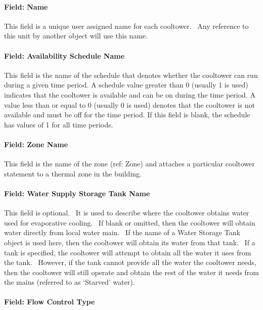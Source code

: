 \paragraph{Field: Name}\label{field-name-8-002}

This field is a unique user assigned name for each cooltower.~ Any reference to this unit by another object will use this name.

\paragraph{Field: Availability Schedule Name}\label{field-availability-schedule-name-000}

This field is the name of the schedule that denotes whether the cooltower can run during a given time period. A schedule value greater than 0 (usually 1 is used) indicates that the cooltower is available and can be on during the time period. A value less than or equal to 0 (usually 0 is used) denotes that the cooltower is not available and must be off for the time period. If this field is blank, the schedule has values of 1 for all time periods.

\paragraph{Field: Zone Name}\label{field-zone-name-6}

This field is the name of the zone (ref: Zone) and attaches a particular cooltower statement to a thermal zone in the building.

\paragraph{Field: Water Supply Storage Tank Name}\label{field-water-supply-storage-tank-name}

This field is optional. ~It is used to describe where the cooltower obtains water used for evaporative cooling. ~If blank or omitted, then the cooltower will obtain water directly from local water main. ~If the name of a Water Storage Tank object is used here, then the cooltower will obtain its water from that tank. ~If a tank is specified, the cooltower will attempt to obtain all the water it uses from the tank. ~However, if the tank cannot provide all the water the cooltower needs, then the cooltower will still operate and obtain the rest of the water it needs from the mains (referred to as `Starved' water).

\paragraph{Field: Flow Control Type}\label{field-flow-control-type}

